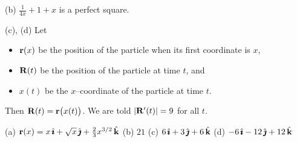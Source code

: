 \begin{hint} 
(b) $\frac{1}{4x}+1+x$ is a perfect square.

(c), (d) Let 
\begin{itemize}\itemsep1pt \parskip0pt  %
\item
  $\mathbf{r}(x)$ be the position of the particle when its first coordinate is $x$,
\item
 $\mathbf{R}(t)$ be the position of the particle at time $t$, and 
\item 
  $x(t)$ be the $x$--coordinate of the particle at time $t$.
\end{itemize}
Then $\mathbf{R}(t) = \mathbf{r}\big(x(t)\big)$. We are told $|\mathbf{R}'(t)|=9$ for all $t$.
\end{hint}

\begin{answer} 
(a) $\mathbf{r}(x)=x\,\hat{\pmb{\imath}}+\sqrt{x}\,\hat{\pmb{\jmath}}+\frac{2}{3}x^{3/2}\,\hat{\mathbf{k}}$\quad
(b) $21$\quad
(c) $6\,\hat{\pmb{\imath}}+3\,\hat{\pmb{\jmath}}+6\,\hat{\mathbf{k}}$\quad
(d) $-6\,\hat{\pmb{\imath}}-12\,\hat{\pmb{\jmath}}+12\,\hat{\mathbf{k}}$
\end{answer}

